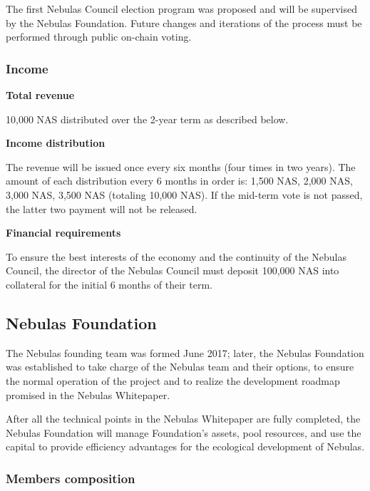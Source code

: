 The first Nebulas Council election program was proposed and will be supervised by the Nebulas Foundation. Future changes and iterations of the process must be performed through public on-chain voting.


\subsubsection{Income}

\textbf{Total revenue}

10,000 NAS distributed over the 2-year term as described below.

\vspace{2em}

\textbf{Income distribution}

The revenue will be issued once every six months (four times in two years). The amount of each distribution every 6 months in order is: 1,500 NAS, 2,000 NAS, 3,000 NAS, 3,500 NAS (totaling 10,000 NAS). If the mid-term vote is not passed, the latter two payment will not be released.

\vspace{2em}

\textbf{Financial requirements}

To ensure the best interests of the economy and the continuity of the Nebulas Council, the director of the Nebulas Council must deposit 100,000 NAS into collateral for the initial 6 months of their term.

\vspace{2em}

\subsection{Nebulas Foundation}

The Nebulas founding team was formed June 2017; later, the Nebulas Foundation was established to take charge of the Nebulas team and their options, to ensure the normal operation of the project and to realize the development roadmap promised in the Nebulas Whitepaper.

After all the technical points in the Nebulas Whitepaper are fully completed, the Nebulas Foundation will manage Foundation’s assets, pool resources, and use the capital to provide efficiency advantages for the ecological development of Nebulas.

\subsubsection{Members composition}

